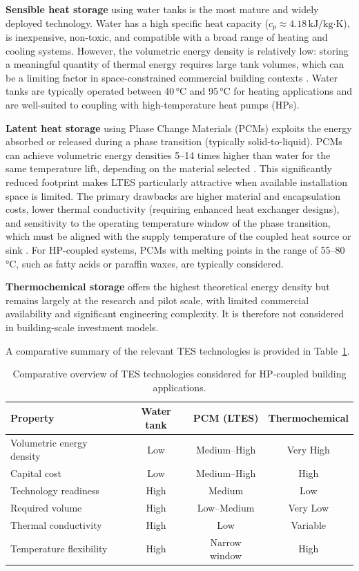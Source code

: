 \documentclass[11pt,a4paper]{report}
\begin{document}
\textbf{Sensible heat storage} using water tanks is the most mature and widely deployed technology. Water has a high specific heat capacity ($c_p \approx 4.18\,\text{kJ/kg·K}$), is inexpensive, non-toxic, and compatible with a broad range of heating and cooling systems. However, the volumetric energy density is relatively low: storing a meaningful quantity of thermal energy requires large tank volumes, which can be a limiting factor in space-constrained commercial building contexts \cite{Dincer2018}. Water tanks are typically operated between 40\,°C and 95\,°C for heating applications and are well-suited to coupling with high-temperature heat pumps (HPs).

\textbf{Latent heat storage} using Phase Change Materials (PCMs) exploits the energy absorbed or released during a phase transition (typically solid-to-liquid). PCMs can achieve volumetric energy densities 5--14 times higher than water for the same temperature lift, depending on the material selected \cite{Sharma2009}. This significantly reduced footprint makes LTES particularly attractive when available installation space is limited. The primary drawbacks are higher material and encapsulation costs, lower thermal conductivity (requiring enhanced heat exchanger designs), and sensitivity to the operating temperature window of the phase transition, which must be aligned with the supply temperature of the coupled heat source or sink \cite{Cabeza2014}. For HP-coupled systems, PCMs with melting points in the range of 55--80\,°C, such as fatty acids or paraffin waxes, are typically considered.

\textbf{Thermochemical storage} offers the highest theoretical energy density but remains largely at the research and pilot scale, with limited commercial availability and significant engineering complexity. It is therefore not considered in building-scale investment models.

A comparative summary of the relevant TES technologies is provided in Table~\ref{tab:tes_comparison}.

\begin{table}[h]
\centering
\caption{Comparative overview of TES technologies considered for HP-coupled building applications.}
\label{tab:tes_comparison}
\begin{tabular}{lccc}
\hline
\textbf{Property} & \textbf{Water tank} & \textbf{PCM (LTES)} & \textbf{Thermochemical} \\
\hline
Volumetric energy density & Low & Medium--High & Very High \\
Capital cost & Low & Medium--High & High \\
Technology readiness & High & Medium & Low \\
Required volume & High & Low--Medium & Very Low \\
Thermal conductivity & High & Low & Variable \\
Temperature flexibility & High & Narrow window & High \\
\hline
\end{tabular}
\end{table}
\end{document}
